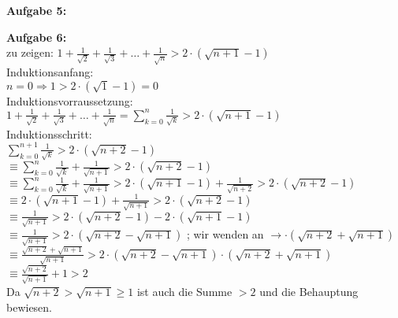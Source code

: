 \documentclass[a4paper]{scrartcl}
\begin{document}
	\begin{flushleft}
		\textbf{Aufgabe 5:}\\		
	\end{flushleft}
	\begin{flushleft}
		\textbf{Aufgabe 6:}\\	
		zu zeigen: $1 + \frac{1}{\sqrt{2}} + \frac{1}{\sqrt{3}} + \dots + \frac{1}{\sqrt{n}}> 2\cdot(\sqrt{n+1} -1)$\\[1em]
		Induktionsanfang:\\
		$n=0\Rightarrow 1 > 2\cdot(\sqrt{1} -1) = 0$\\[1em]
		Induktionsvorraussetzung:\\
		$1 + \frac{1}{\sqrt{2}} + \frac{1}{\sqrt{3}} + \dots + \frac{1}{\sqrt{n}}= \sum\limits_{k=0}^{n}\frac{1}{\sqrt{k}}> 2\cdot(\sqrt{n+1} -1)$\\[1em]
		Induktionsschritt:\\
		$\sum\limits_{k=0}^{n+1}\frac{1}{\sqrt{k}}> 2\cdot(\sqrt{n+2} -1)$\\
		$\equiv \sum\limits_{k=0}^{n}\frac{1}{\sqrt{k}} + \frac{1}{\sqrt{n+1}}> 2\cdot(\sqrt{n+2} -1)$\\
		$\equiv \sum\limits_{k=0}^{n}\frac{1}{\sqrt{k}} + \frac{1}{\sqrt{n+1}}> 2\cdot(\sqrt{n+1} -1) + \frac{1}{\sqrt{n+2}} > 2\cdot(\sqrt{n+2} -1)$\\
		$\equiv 2\cdot(\sqrt{n+1} -1) + \frac{1}{\sqrt{n+1}} > 2\cdot(\sqrt{n+2} -1)$\\
		$\equiv \frac{1}{\sqrt{n+1}} > 2\cdot(\sqrt{n+2} -1) - 2\cdot(\sqrt{n+1} -1)$\\
		$\equiv \frac{1}{\sqrt{n+1}} > 2\cdot(\sqrt{n+2}-\sqrt{n+1})$             ; wir wenden an $\rightarrow \cdot (\sqrt{n+2}+\sqrt{n+1})$\\
		$\equiv \frac{\sqrt{n+2}+\sqrt{n+1}}{\sqrt{n+1}} > 2\cdot(\sqrt{n+2}-\sqrt{n+1})\cdot(\sqrt{n+2}+\sqrt{n+1})$\\ 
		$\equiv \frac{\sqrt{n+2}}{\sqrt{n+1}}+1 > 2$\\ 
		Da $\sqrt{n+2}>\sqrt{n+1}\geq 1$ ist auch die Summe $>2$ und die Behauptung bewiesen.\\[1em]
	\end{flushleft}
\end{document}
